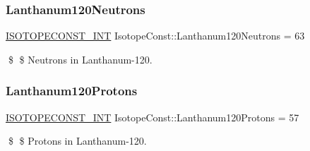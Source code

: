 \subsubsection{\texorpdfstring{Lanthanum120\+Neutrons}{Lanthanum120Neutrons}}
{\footnotesize\ttfamily \mbox{\hyperlink{group___isotope_const-_macros_ga5f18360b3e99483a35c32d789e62621c}{I\+S\+O\+T\+O\+P\+E\+C\+O\+N\+S\+T\+\_\+\+I\+NT}} Isotope\+Const\+::\+Lanthanum120\+Neutrons = 63}

\$ \$ Neutrons in Lanthanum-\/120. \mbox{\label{group___isotope_const-_lanthanum-_la120_gadca08345edfdad45345c709d9e4825e2}} 
\subsubsection{\texorpdfstring{Lanthanum120\+Protons}{Lanthanum120Protons}}
{\footnotesize\ttfamily \mbox{\hyperlink{group___isotope_const-_macros_ga5f18360b3e99483a35c32d789e62621c}{I\+S\+O\+T\+O\+P\+E\+C\+O\+N\+S\+T\+\_\+\+I\+NT}} Isotope\+Const\+::\+Lanthanum120\+Protons = 57}

\$ \$ Protons in Lanthanum-\/120. 